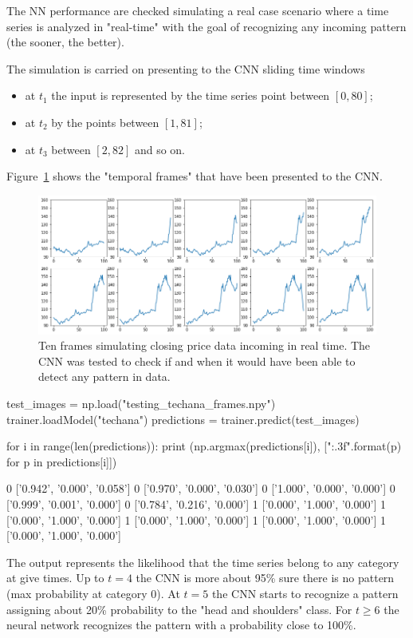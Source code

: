 The NN performance are checked simulating a real case scenario where a time series is analyzed in "real-time" with the goal of recognizing any incoming pattern (the sooner, the better). 

The simulation is carried on presenting to the CNN sliding time windows
\begin{itemize}
	\item at $t_1$ the input is represented by the time series point between \([0, 80]\);
	\item at $t_2$ by the points between \([1, 81]\);
	\item at $t_3$ between \([2, 82]\) and so on.
\end{itemize}

Figure~\ref{fig:frame_simulation} shows the "temporal frames" that have been presented to the CNN.

\begin{figure}
\centering
\includegraphics[width=\textwidth]{figures/tech_ana_frames}
\caption{Ten frames simulating closing price data incoming in real time. The CNN was tested to check if and when it would have been able to detect any pattern in data.}
\label{fig:frame_simulation}
\end{figure}

\begin{ipython}
test_images = np.load("testing_techana_frames.npy")
trainer.loadModel("techana")
predictions = trainer.predict(test_images)

for i in range(len(predictions)):
    print (np.argmax(predictions[i]), ["{:.3f}".format(p) for p in predictions[i]])
\end{ipython}
\begin{ioutput}
0 ['0.942', '0.000', '0.058']
0 ['0.970', '0.000', '0.030']
0 ['1.000', '0.000', '0.000']
0 ['0.999', '0.001', '0.000']
0 ['0.784', '0.216', '0.000']
1 ['0.000', '1.000', '0.000']
1 ['0.000', '1.000', '0.000']
1 ['0.000', '1.000', '0.000']
1 ['0.000', '1.000', '0.000']
1 ['0.000', '1.000', '0.000']
\end{ioutput}
\noindent
The output represents the likelihood that the time series  belong to any category at give times. Up to $t=4$ the CNN is more about 95\% sure there is no pattern (max probability at category 0). 
At $t=5$ the CNN starts to recognize a pattern assigning about 20\% probability to the "head and shoulders" class. For $t\geq 6$ the neural network recognizes the pattern with a probability close to 100\%.


